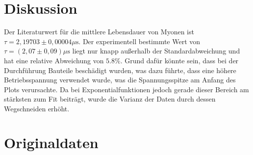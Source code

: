 \section{Diskussion}
\label{sec:Diskussion}
Der Literaturwert für die mittlere Lebensdauer von Myonen ist $\tau = 2,19703 \pm 0,00004 \text{$\mu$s}$. \cite{myon_chemie_de} Der experimentell bestimmte Wert von $\tau = (2,07 \pm 0,09)\text{$\mu$s}$ liegt nur knapp außerhalb der Standardabweichung und hat eine relative Abweichung von $5.8\%$. Grund dafür könnte sein, dass bei der Durchführung Bauteile beschädigt wurden, was dazu führte, dass eine höhere Betriebsspannung verwendet wurde, was die Spannungsspitze am Anfang des Plots verursachte. Da bei Exponentialfunktionen jedoch gerade dieser Bereich am stärksten zum Fit beiträgt, wurde die Varianz der Daten durch dessen Wegschneiden erhöht.

\section{Originaldaten}



